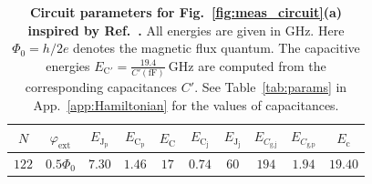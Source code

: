 \documentclass[%
reprint,
superscriptaddress,
 amsmath,amssymb,
 aps,
 prx,
longbibliography,
floatfix,
]{revtex4-2}
\begin{document}
\renewcommand{\arraystretch}{1.5} %
\begin{table}[htb]
\centering
\begin{tabular}{|c|c|c|c|c|c|c|c|c|c|}
    \hline
     $N$ & $\varphi_{\textrm{ext}}$ & $E_{\textrm{J}_\textrm{p}}$ & $E_{\textrm{C}_\textrm{p}}$ & $E_{\textrm{C}}$ & $E_{\textrm{C}_\textrm{j}}$ & $E_{\textrm{J}_\textrm{j}}$ & $E_{C_\textrm{g,j}}$ & $E_{C_\textrm{g,p}}$ & $E_{\textrm{c}}$ \\
    \hline
    $122$ & $0.5\Phi_0$ & $7.30$ & $1.46$ & $17$ & $0.74$ & $60$ & $194$ & $1.94$ & $19.40$ \\
    \hline
\end{tabular}
\caption{{\bf Circuit parameters for Fig.~\ref{fig:meas_circuit}(a) inspired by Ref.~\cite{zhang_universal_2021}.} All energies are given in GHz. Here $\Phi_0=h/2e$ denotes the magnetic flux quantum. The capacitive energies $E_{\textrm{C}'}=\frac{19.4}{{C'}(\mathrm{fF})} \ \mathrm{GHz}$ are computed from the corresponding capacitances $C'$. See Table~\ref{tab:params} in App.~\ref{app:Hamiltonian} for the values of capacitances.}
\label{tab:circuit_params}
\end{table}







\renewcommand{\arraystretch}{1.5} %
\end{document}
